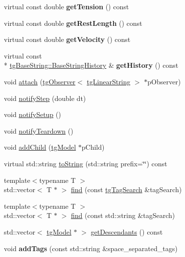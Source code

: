 \begin{DoxyCompactItemize}
\item 
\hypertarget{classtg_linear_string_aa15675c6077e36e7bc2af241d35a5558}{virtual const double {\bfseries get\-Tension} () const }\label{classtg_linear_string_aa15675c6077e36e7bc2af241d35a5558}

\item 
\hypertarget{classtg_linear_string_ada03e9507dbd7f3e8573e2dceaf0a05e}{virtual const double {\bfseries get\-Rest\-Length} () const }\label{classtg_linear_string_ada03e9507dbd7f3e8573e2dceaf0a05e}

\item 
\hypertarget{classtg_linear_string_afab568f679f8f95292a4cdfb2825ae05}{virtual const double {\bfseries get\-Velocity} () const }\label{classtg_linear_string_afab568f679f8f95292a4cdfb2825ae05}

\item 
\hypertarget{classtg_linear_string_a4daf160d7d0a54c3c8ffb893046af2e0}{virtual const \\*
\hyperlink{structtg_base_string_1_1_base_string_history}{tg\-Base\-String\-::\-Base\-String\-History} \& {\bfseries get\-History} () const }\label{classtg_linear_string_a4daf160d7d0a54c3c8ffb893046af2e0}

\item 
void \hyperlink{classtg_subject_a56ecfd33a048c3a7f1a884318d9af548}{attach} (\hyperlink{classtg_observer}{tg\-Observer}$<$ \hyperlink{classtg_linear_string}{tg\-Linear\-String} $>$ $\ast$p\-Observer)
\item 
void \hyperlink{classtg_subject_ad9640aa7fcc1e0b4ce8a913a4ce1ea42}{notify\-Step} (double dt)
\item 
void \hyperlink{classtg_subject_a80799e5d0c8512d3d05a55764790392b}{notify\-Setup} ()
\item 
void \hyperlink{classtg_subject_adf7a60dbb0faf0de5528f862e7953e63}{notify\-Teardown} ()
\item 
void \hyperlink{classtg_model_a292c17848b96caee32b2286e44c13f2f}{add\-Child} (\hyperlink{classtg_model}{tg\-Model} $\ast$p\-Child)
\item 
virtual std\-::string \hyperlink{classtg_model_af37b0c1a6d4060bfe0bb9b5038a17725}{to\-String} (std\-::string prefix=\char`\"{}\char`\"{}) const 
\item 
{\footnotesize template$<$typename T $>$ }\\std\-::vector$<$ T $\ast$ $>$ \hyperlink{classtg_model_ab75836fdfbd9200f165c3b28a19630c0}{find} (const \hyperlink{classtg_tag_search}{tg\-Tag\-Search} \&tag\-Search)
\item 
{\footnotesize template$<$typename T $>$ }\\std\-::vector$<$ T $\ast$ $>$ \hyperlink{classtg_model_aa40b5fb32f8941e04d537f4e6c6db35c}{find} (const std\-::string \&tag\-Search)
\item 
std\-::vector$<$ \hyperlink{classtg_model}{tg\-Model} $\ast$ $>$ \hyperlink{classtg_model_a2efa4321fa5c77b4ce23b01f6fd3a1c4}{get\-Descendants} () const 
\item 
\hypertarget{classtg_taggable_af0b8f1729653b0b90d2fecbd51163612}{void {\bfseries add\-Tags} (const std\-::string \&space\-\_\-separated\-\_\-tags)}\label{classtg_taggable_af0b8f1729653b0b90d2fecbd51163612}


\end{DoxyCompactItemize}
